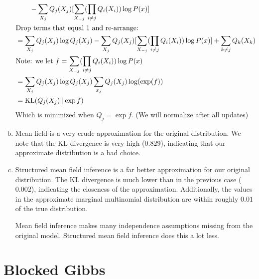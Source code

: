 \documentclass[12pt, letterpaper]{article}
\begin{document}
\begin{enumerate}[a.]
\begin{align*}
            &\qquad {} - \sum_{X_j} Q_j(X_j)[\sum_{X_{-j}} (\Qdef[i \neq j]) \log P(x)]\\
        &\text{Drop terms that equal 1 and re-arrange:}\\
        &= \sum_{X_j} Q_j(X_j) \log Q_j(X_j) 
          - \sum_{X_j}Q_j(X_j)[\sum_{X_{-j}}(\Qdef[i \neq j]) \log P(x)]
          + \sum_{k \neq j} Q_k(X_k)\\
        &\text{Note: we let } f = \sum_{X_{-j}}(\Qdef[i \neq j]) \log P(x)\\
        &= \sum_{X_j} Q_j(X_j) \log Q_j(X_j) \sum_{x_j} Q_j(X_j) \log (\exp(f))\\
        &= \text{KL}(Q_j(X_j)||\exp f)
    \end{align*}
    Which is minimized when $Q_j = \exp f$. (We will normalize after all updates)

\item Mean field is a very crude approximation for the original distribution. We note that the KL divergence is very high ($0.829$), indicating that our approximate distribution is a bad choice.
\item Structured mean field inference is a far better approximation for our original distribution. The KL divergence is much lower than in the previous case ($0.002$), indicating the closeness of the approximation. Additionally, the values in the approximate marginal multinomial distribution are within roughly $0.01$ of the true distribution.

Mean field inference makes many independence assumptions missing from the original model. Structured mean field inference does this a lot less.
\end{enumerate}

\setcounter{section}{4}
\section{Blocked Gibbs}
\end{document}
